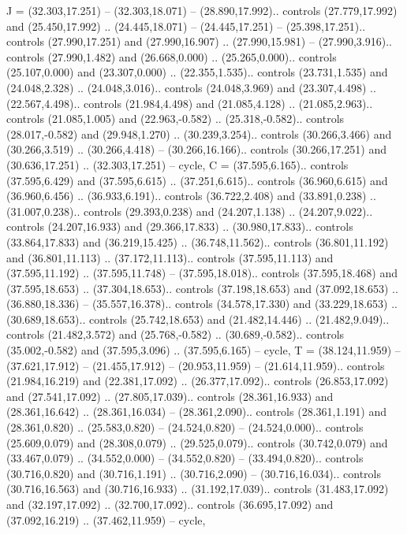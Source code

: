 {J} = {(32.303,17.251) -- (32.303,18.071) -- (28.890,17.992).. controls (27.779,17.992) and (25.450,17.992) .. (24.445,18.071) -- (24.445,17.251) -- (25.398,17.251).. controls (27.990,17.251) and (27.990,16.907) .. (27.990,15.981) -- (27.990,3.916).. controls (27.990,1.482) and (26.668,0.000) .. (25.265,0.000).. controls (25.107,0.000) and (23.307,0.000) .. (22.355,1.535).. controls (23.731,1.535) and (24.048,2.328) .. (24.048,3.016).. controls (24.048,3.969) and (23.307,4.498) .. (22.567,4.498).. controls (21.984,4.498) and (21.085,4.128) .. (21.085,2.963).. controls (21.085,1.005) and (22.963,-0.582) .. (25.318,-0.582).. controls (28.017,-0.582) and (29.948,1.270) .. (30.239,3.254).. controls (30.266,3.466) and (30.266,3.519) .. (30.266,4.418) -- (30.266,16.166).. controls (30.266,17.251) and (30.636,17.251) .. (32.303,17.251) -- cycle},
{C} = {(37.595,6.165).. controls (37.595,6.429) and (37.595,6.615) .. (37.251,6.615).. controls (36.960,6.615) and (36.960,6.456) .. (36.933,6.191).. controls (36.722,2.408) and (33.891,0.238) .. (31.007,0.238).. controls (29.393,0.238) and (24.207,1.138) .. (24.207,9.022).. controls (24.207,16.933) and (29.366,17.833) .. (30.980,17.833).. controls (33.864,17.833) and (36.219,15.425) .. (36.748,11.562).. controls (36.801,11.192) and (36.801,11.113) .. (37.172,11.113).. controls (37.595,11.113) and (37.595,11.192) .. (37.595,11.748) -- (37.595,18.018).. controls (37.595,18.468) and (37.595,18.653) .. (37.304,18.653).. controls (37.198,18.653) and (37.092,18.653) .. (36.880,18.336) -- (35.557,16.378).. controls (34.578,17.330) and (33.229,18.653) .. (30.689,18.653).. controls (25.742,18.653) and (21.482,14.446) .. (21.482,9.049).. controls (21.482,3.572) and (25.768,-0.582) .. (30.689,-0.582).. controls (35.002,-0.582) and (37.595,3.096) .. (37.595,6.165) -- cycle},
{T} = {(38.124,11.959) -- (37.621,17.912) -- (21.455,17.912) -- (20.953,11.959) -- (21.614,11.959).. controls (21.984,16.219) and (22.381,17.092) .. (26.377,17.092).. controls (26.853,17.092) and (27.541,17.092) .. (27.805,17.039).. controls (28.361,16.933) and (28.361,16.642) .. (28.361,16.034) -- (28.361,2.090).. controls (28.361,1.191) and (28.361,0.820) .. (25.583,0.820) -- (24.524,0.820) -- (24.524,0.000).. controls (25.609,0.079) and (28.308,0.079) .. (29.525,0.079).. controls (30.742,0.079) and (33.467,0.079) .. (34.552,0.000) -- (34.552,0.820) -- (33.494,0.820).. controls (30.716,0.820) and (30.716,1.191) .. (30.716,2.090) -- (30.716,16.034).. controls (30.716,16.563) and (30.716,16.933) .. (31.192,17.039).. controls (31.483,17.092) and (32.197,17.092) .. (32.700,17.092).. controls (36.695,17.092) and (37.092,16.219) .. (37.462,11.959) -- cycle},
